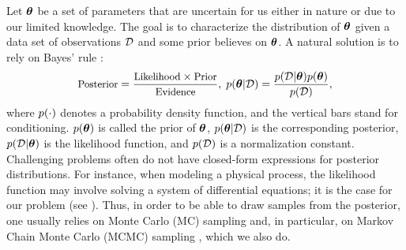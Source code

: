 Let ${\boldsymbol\theta}$ be a set of parameters that are uncertain for us either in nature or due to our limited knowledge. The goal is to characterize the distribution of ${\boldsymbol\theta}$ given a data set of observations $\mathcal{D}$ and some prior believes on ${\boldsymbol\theta}$. A natural solution is to rely on Bayes' rule \cite{gelman2004}:
\begin{equation} \elabel{bayes}
  \text{\small Posterior} = \frac{\text{\small Likelihood} \times \text{\small Prior}}{\text{\small Evidence}}, \; \f{\vparam | \Data} = \frac{\f{\Data | \vparam} \f{\vparam}}{\f{\Data}},
\end{equation}
where $\f{\cdot}$ denotes a probability density function, and the vertical bars stand for conditioning. $\f{\vparam}$ is called the prior of ${\boldsymbol\theta}$, $\f{\vparam | \Data}$ is the corresponding posterior, $\f{\Data | \vparam}$ is the likelihood function, and $\f{\Data}$ is a normalization constant. Challenging problems often do not have closed-form expressions for posterior distributions. For instance, when modeling a physical process, the likelihood function may involve solving a system of differential equations; it is the case for our problem (see ). Thus, in order to be able to draw samples from the posterior, one usually relies on Monte Carlo (MC) sampling and, in particular, on Markov Chain Monte Carlo (MCMC) sampling \cite{gelman2004}, which we also do.

